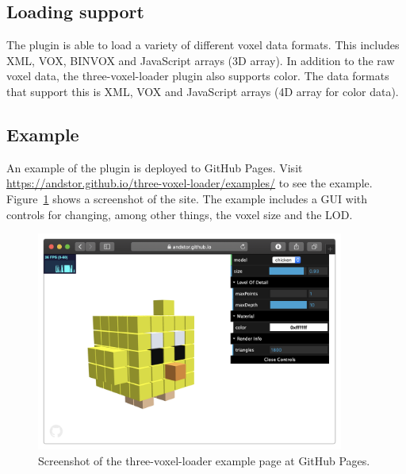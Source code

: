 \subsection{Loading support}
The plugin is able to load a variety of different voxel data formats. This includes XML, VOX, BINVOX and JavaScript arrays (3D array). In addition to the raw voxel data, the three-voxel-loader plugin also supports color. The data formats that support this is XML, VOX and JavaScript arrays (4D array for color data).

\subsection{Example}
An example of the plugin is deployed to GitHub Pages. Visit \url{https://andstor.github.io/three-voxel-loader/examples/} to see the example. Figure~\ref{fig:three-voxel-loader-example} shows a screenshot of the site. The example includes a GUI with controls for changing, among other things, the voxel size and the LOD.
\begin{figure}[ht]
    \centering
    \includegraphics[width=0.9\textwidth]{sections/result/figures/three-voxel-loader-example.png}
    \caption{Screenshot of the three-voxel-loader example page at GitHub Pages.}
    \label{fig:three-voxel-loader-example}
\end{figure}

